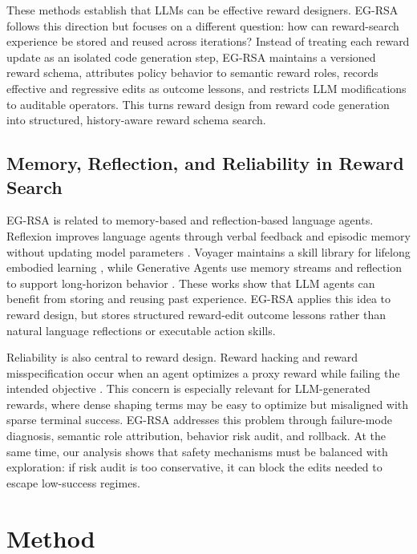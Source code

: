 \documentclass[11pt]{article}
\begin{document}
These methods establish that LLMs can be effective reward designers. EG-RSA follows this direction but focuses on a different question: how can reward-search experience be stored and reused across iterations? Instead of treating each reward update as an isolated code generation step, EG-RSA maintains a versioned reward schema, attributes policy behavior to semantic reward roles, records effective and regressive edits as outcome lessons, and restricts LLM modifications to auditable operators. This turns reward design from reward code generation into structured, history-aware reward schema search.

\subsection{Memory, Reflection, and Reliability in Reward Search}

EG-RSA is related to memory-based and reflection-based language agents. Reflexion improves language agents through verbal feedback and episodic memory without updating model parameters \citep{shinn2023reflexion}. Voyager maintains a skill library for lifelong embodied learning \citep{wang2023voyager}, while Generative Agents use memory streams and reflection to support long-horizon behavior \citep{park2023generative}. These works show that LLM agents can benefit from storing and reusing past experience. EG-RSA applies this idea to reward design, but stores structured reward-edit outcome lessons rather than natural language reflections or executable action skills.

Reliability is also central to reward design. Reward hacking and reward misspecification occur when an agent optimizes a proxy reward while failing the intended objective \citep{amodei2016concrete,pan2022effects,skalse2022reward}. This concern is especially relevant for LLM-generated rewards, where dense shaping terms may be easy to optimize but misaligned with sparse terminal success. EG-RSA addresses this problem through failure-mode diagnosis, semantic role attribution, behavior risk audit, and rollback. At the same time, our analysis shows that safety mechanisms must be balanced with exploration: if risk audit is too conservative, it can block the edits needed to escape low-success regimes.

\section{Method}
\label{sec:method}
\end{document}
